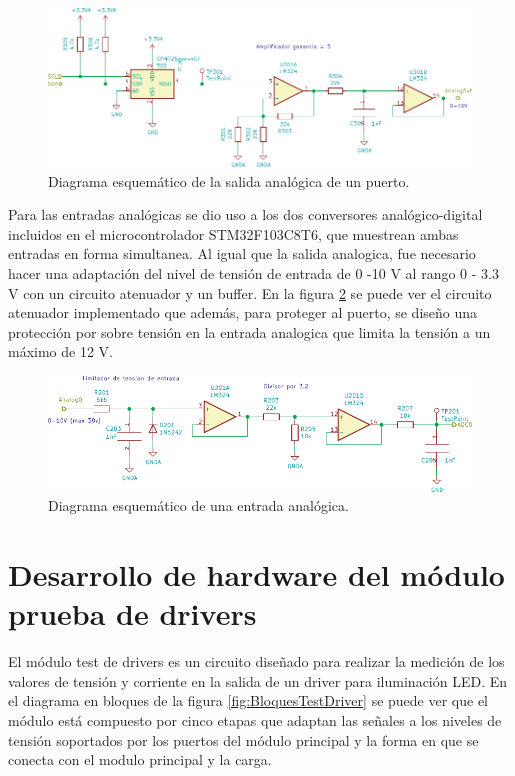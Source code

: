 \begin{figure}[H]
	\centering
	\includegraphics[width=1\textwidth]{./Figures/SalidaAnalogica.pdf}
	\caption{Diagrama esquemático de la salida analógica de un puerto.}
	\label{fig:SalidaAnalogica}
\end{figure}

Para las entradas analógicas se dio uso a los dos conversores analógico-digital incluidos en el microcontrolador STM32F103C8T6, que muestrean ambas entradas en forma simultanea. Al igual que la salida analogica, fue necesario hacer una adaptación del nivel de tensión de entrada de 0 -10 V al rango 0 - 3.3 V con un circuito atenuador y un buffer. En la figura \ref{fig:EntradaAnalogica} se puede ver el circuito atenuador implementado que además, para proteger al puerto, se diseño una protección por sobre tensión en la entrada analogica que limita la tensión a un máximo de 12 V.

\begin{figure}[H]
	\centering
	\includegraphics[width=1\textwidth]{./Figures/EntradaAnalogica.pdf}
	\caption{Diagrama esquemático de una entrada analógica.}
	\label{fig:EntradaAnalogica}
\end{figure}




\section{Desarrollo de hardware del módulo prueba de drivers}

El módulo test de drivers es un circuito diseñado para realizar la medición de los valores de tensión y corriente en la salida de un driver para iluminación LED. En el diagrama en bloques de la figura \ref{fig:BloquesTestDriver} se puede ver que el módulo está compuesto por cinco etapas que adaptan las señales a los niveles de tensión soportados por los puertos del módulo principal y la forma en que se conecta con el modulo principal y la carga.

